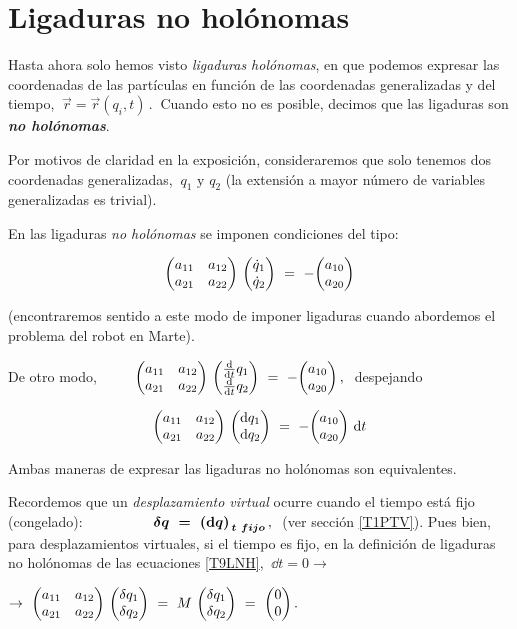 \section{Ligaduras no holónomas}

Hasta ahora solo hemos visto \emph{ligaduras holónomas}, en que podemos expresar las coordenadas de las partículas en función de las coordenadas generalizadas y del tiempo, $\ \vec r=\vec r(q_i,t)\, . \ $ Cuando esto no es posible, decimos que las ligaduras son \emph{\textbf{no holónomas}}.

Por motivos de claridad en la exposición, consideraremos que solo tenemos dos coordenadas generalizadas, $\ q_1 \text{ y } q_2$ (la extensión a mayor número de variables generalizadas es trivial).

En las ligaduras \emph{no holónomas} se imponen condiciones del tipo:

\begin{equation}
\label{T9Def1LNH}
\mqty(\xmat*{a}{2}{2}) \ \mqty(\dot q_1 \\ \dot q_2)  \ = \ - \mqty(a_{10}\\a_{20})
\end{equation}

\textcolor{gris}{(encontraremos sentido a este modo de imponer ligaduras cuando abordemos el problema del robot en Marte).}

De otro modo, $\qquad  \displaystyle \ \mqty(\xmat*{a}{2}{2}) \ \mqty(\dv{t} q_1 \\ \dv{t} q_2)  \ = \ - \mqty(a_{10}\\a_{20})\, , \ $ despejando

\begin{equation}
\label{T9LNH}
\mqty(\xmat*{a}{2}{2}) \ \mqty(\dd q_1 \\ \dd q_2)  \ = \ - \mqty(a_{10}\\a_{20}) \ \dd t
\end{equation}

Ambas maneras de expresar las ligaduras no holónomas son equivalentes.

Recordemos que un \emph{desplazamiento virtual} ocurre cuando el tiempo está fijo (congelado):  $\qquad $  $\qquad $ $\boldsymbol{\var q \ = \ {(\dd q)}_{\, t\ fijo}}\, , \ $ (ver sección \ref{T1PTV}). Pues bien, para desplazamientos virtuales, si el tiempo es fijo, en la definición de ligaduras no holónomas de las ecuaciones \ref{T9LNH}, $\ \dd t=0 \to $

$\displaystyle  \to \ \mqty(\xmat*{a}{2}{2}) \  \mqty(\var   q_1 \\ \var   q_2) \ = \ M  \  \mqty(\var  q_1 \\ \var  q_2) \ = \  \mqty(0 \\ 0) \, . \ $ 

